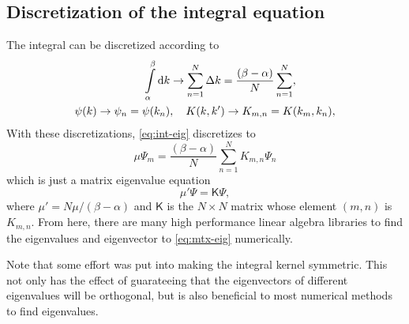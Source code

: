 \documentclass[11pt,a4paper, 
swedish,english %
]{article}
\begin{document}
\subsection{Discretization of the integral equation}
The integral can be discretized according to
\begin{equation} \label{eq:inttosum}
\begin{aligned}
 \int_{\alpha}^\beta \rd{k} &\to \sum_{n=1}^N\Delta{k}
=\frac{(\beta-\alpha)}{N} \sum_{n=1}^N,\\
\psi(k) \to \psi_n = \psi(k_n) &\qcomma
K(k, k') \to K_{m, n} = K(k_m, k_n),
\end{aligned}
\end{equation}
With these discretizations, \eqref{eq:int-eig} discretizes to
\begin{equation}
\mu\Psi_m = \frac{(\beta-\alpha)}{N} \sum_{n=1}^N K_{m, n} \Psi_n
\end{equation}
which is just a matrix eigenvalue equation
\begin{equation} \label{eq:mtx-eig}
\mu' \Psi = \mathsf{K}\Psi,
\end{equation}
where $\mu'=N\mu/(\beta-\alpha)$ and $\mathsf{K}$ is the $N\times N$ matrix
whose element $(m, n)$ is $K_{m, n}$. From here, there are many high
performance linear algebra libraries to find the eigenvalues and
eigenvector to \eqref{eq:mtx-eig} numerically. 

Note that some effort was put into making the integral
kernel symmetric. This not only has the effect of guarateeing that the
eigenvectors of different eigenvalues will be orthogonal, but is also
beneficial to most numerical methods to find eigenvalues. 


\end{document}
